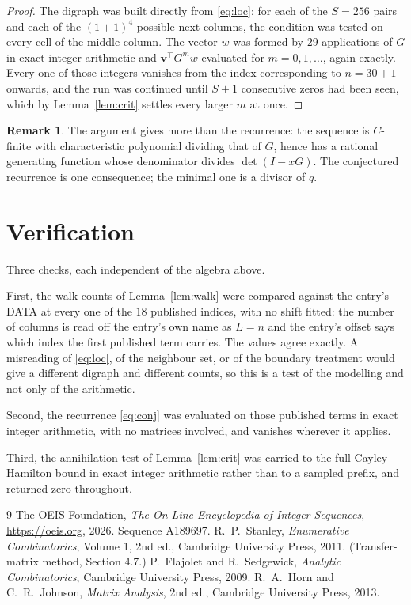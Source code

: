 \documentclass[11pt,a4paper]{article}
\theoremstyle{plain}
\theoremstyle{definition}
\newtheorem{remark}[theorem]{Remark}
\begin{document}
\begin{proof}
The digraph was built directly from \eqref{eq:loc}: for each of the $S=256$ pairs and each
of the $(1+1)^{4}$ possible next columns, the condition was tested on every cell of
the middle column. The vector $w$ was formed by $29$ applications of $G$ in exact integer
arithmetic and $\mathbf{v}^{\!\top}G^{m}w$ evaluated for $m=0,1,\dots$, again exactly.
Every one of those integers vanishes from the index corresponding to $n=30+1$ onwards,
and the run was continued until $S+1$ consecutive zeros had been seen, which by
Lemma~\ref{lem:crit} settles every larger $m$ at once.
\end{proof}

\begin{remark}
The argument gives more than the recurrence: the sequence is $C$-finite with characteristic
polynomial dividing that of $G$, hence has a rational generating function whose denominator
divides $\det(I-xG)$. The conjectured recurrence is one consequence; the minimal one is a
divisor of $q$.
\end{remark}

\section{Verification}

Three checks, each independent of the algebra above.

First, the walk counts of Lemma~\ref{lem:walk} were compared against the entry's DATA at
every one of the $18$ published indices, with no shift fitted: the number of columns is
read off the entry's own name as $L=n$ and the entry's offset says which index the first
published term carries. The values agree exactly. A misreading of \eqref{eq:loc}, of the
neighbour set, or of the boundary treatment would give a different digraph and different
counts, so this is a test of the modelling and not only of the arithmetic.

Second, the recurrence \eqref{eq:conj} was evaluated on those published terms in exact
integer arithmetic, with no matrices involved, and vanishes wherever it applies.

Third, the annihilation test of Lemma~\ref{lem:crit} was carried to the full
Cayley--Hamilton bound in exact integer arithmetic rather than to a sampled prefix, and
returned zero throughout.

\begin{thebibliography}{9}
 The OEIS Foundation, \emph{The On-Line Encyclopedia of Integer
Sequences}, \url{https://oeis.org}, 2026. Sequence A189697.
 R.~P.~Stanley, \emph{Enumerative Combinatorics}, Volume 1, 2nd ed.,
Cambridge University Press, 2011. (Transfer-matrix method, Section 4.7.)
 P.~Flajolet and R.~Sedgewick, \emph{Analytic Combinatorics}, Cambridge
University Press, 2009.
 R.~A.~Horn and C.~R.~Johnson, \emph{Matrix Analysis}, 2nd ed., Cambridge
University Press, 2013.
\end{thebibliography}
\end{document}
